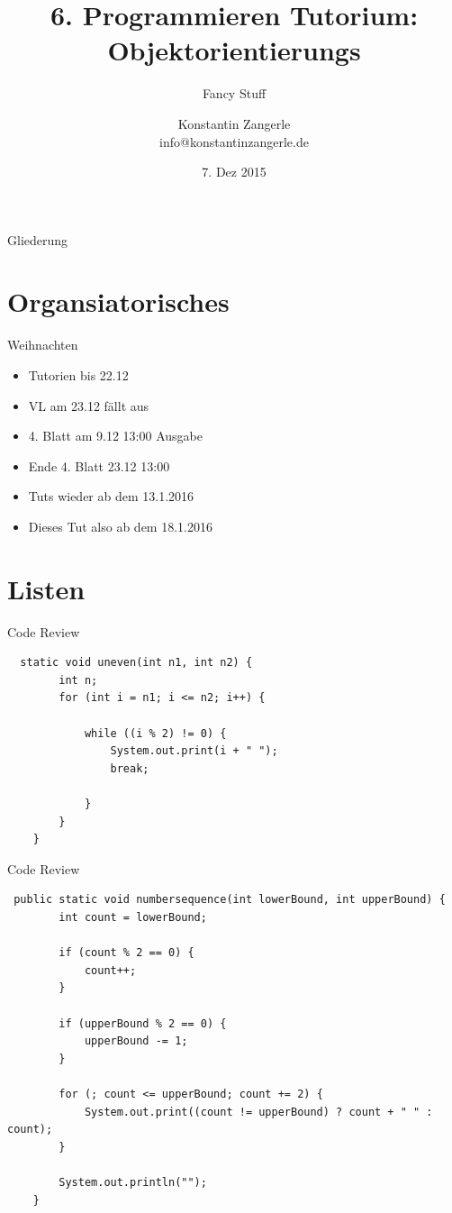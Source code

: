 \documentclass[18pt]{beamer}
\title[Programmieren Tutorium]{6. Programmieren Tutorium:\texorpdfstring{\\}{} Objektorientierungs}
\subtitle{Fancy Stuff}
\author{Konstantin Zangerle \texorpdfstring{\\}{} info@konstantinzangerle.de}
\date{7. Dez 2015}
\begin{document}

\begin{frame}
\titlepage
\end{frame}

\begin{frame}{Gliederung}
\tableofcontents
\end{frame}

\section{Organsiatorisches}

\begin{frame}{Weihnachten}
 \begin{itemize}
  \item Tutorien bis 22.12
  \item VL am 23.12 fällt aus
  \item 4. Blatt am 9.12 13:00 Ausgabe
  \item Ende 4. Blatt 23.12 13:00
  \item Tuts wieder ab dem 13.1.2016
  \item Dieses Tut also ab dem 18.1.2016
 \end{itemize}

\end{frame}

\section{Listen}
\begin{frame}[fragile]{Code Review}
 \begin{lstlisting}
  static void uneven(int n1, int n2) {
        int n;
        for (int i = n1; i <= n2; i++) {
            
            while ((i % 2) != 0) {
                System.out.print(i + " ");
                break;

            }
        }
    }
 \end{lstlisting}
\end{frame}

\begin{frame}[fragile]{Code Review}
 \begin{lstlisting}
 public static void numbersequence(int lowerBound, int upperBound) {
        int count = lowerBound;

        if (count % 2 == 0) {
            count++;
        }

        if (upperBound % 2 == 0) {
            upperBound -= 1;
        }

        for (; count <= upperBound; count += 2) {
            System.out.print((count != upperBound) ? count + " " : count);
        }

        System.out.println("");
    }


 \end{lstlisting}
\end{frame}
\end{document}
